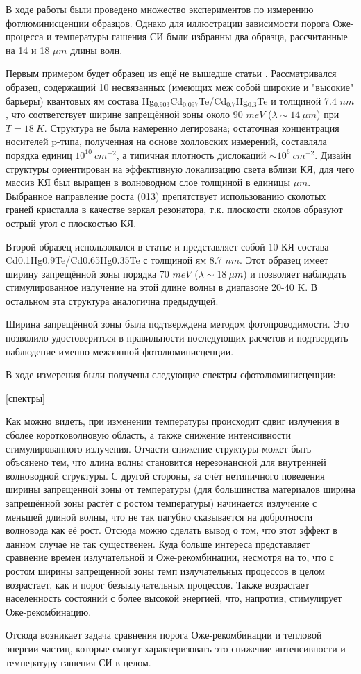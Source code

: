 \documentclass[../main.tex]{subfiles}
\begin{document}
    В ходе работы были проведено множество экспериментов по измерению фотлюминисценции образцов.
    Однако для иллюстрации зависимости порога Оже-процесса и температуры гашения СИ были избранны 
    два образца, рассчитанные на 14 и 18 $\mu m$ длины волн.

    Первым примером будет образец из ещё не вышедше статьи \cite{Utochkin}. Рассматривался образец, содержащий 10 несвязанных
    (имеющих меж собой широкие и "высокие" барьеры) квантовых ям
    состава Hg${}_{0.903}$Cd${}_{0.097}$Te/Cd${}_0.7$Hg${}_{0.3}$Te и толщиной 7.4 $nm$, что соответствует ширине 
    запрещённой зоны около 90 $meV$ ($\lambda \sim 14~\mu m$) при $T = 18 ~K$. Структура не была намеренно легирована; остаточная концентрация 
    носителей p-типа, полученная на основе холловских измерений, составляла порядка единиц $10^10~cm^{-2}$, а типичная 
    плотность дислокаций $\sim 10^6~cm^{-2}$. Дизайн структуры ориентирован на эффективную локализацию света вблизи КЯ, для 
    чего массив КЯ был выращен в волноводном слое толщиной в единицы $\mu m$. Выбранное направление роста (013) 
    препятствует использованию сколотых граней кристалла в качестве зеркал резонатора, т.к. плоскости сколов образуют
    острый угол с плоскостью КЯ.

    Второй образец использовался в статье \cite{Fadeev} и представляет собой 10 КЯ состава Cd0.1Hg0.9Te/Cd0.65Hg0.35Te
    с толщиной ям 8.7 $nm$.
    Этот образец имеет ширину запрещённой зоны порядка 70 $meV$ ($\lambda \sim 18~\mu m$) и позволяет наблюдать стимулированное 
    излучение на этой длине волны в диапазоне  20-40 K. В остальном эта структура аналогична предыдущей.

    Ширина запрещённой зоны была подтверждена методом фотопроводимости. Это позволило удостовериться в правильности последующих 
    расчетов и подтвердить наблюдение именно межзонной фотолюминисценции.

    В ходе измерения были получены следующие спектры сфотолюминисценции:

    [спектры]

    Как можно видеть, при изменении температуры происходит сдвиг излучения в сболее коротковолновую область, а также снижение 
    интенсивности стимулированного излучения. Отчасти снижение структуры может быть объсянено тем, что длина волны становится 
    нерезонансной для внутренней волноводной структуры. С другой стороны, за счёт нетипичного поведения ширины запрещенной 
    зоны от температуры (для большинства материалов ширина запрещённой зоны растёт с ростом температуры) начинается излучение
    с меньшей длиной волны, что не так пагубно сказывается на добротности волновода как её рост. Отсюда можно сделать вывод о том, 
    что этот эффект в данном случае не так существенен. Куда больше интереса представляет сравнение времен излучательной и 
    Оже-рекомбинации, несмотря на то, что с ростом ширины запрещенной зоны темп излучательных процессов в целом возрастает, 
    как и порог безызлучательных процессов. Также возрастает населенность состояний с более высокой энергией, что, напротив,
    стимулирует Оже-рекомбинацию.

    Отсюда возникает задача сравнения порога Оже-рекомбинации и тепловой энергии частиц, которые смогут характеризовать это 
    снижение интенсивности и температуру гашения СИ в целом.
    \newpage
\end{document}
